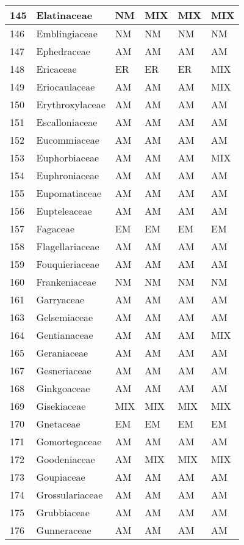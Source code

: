 \documentclass[]{article}
\begin{document}
\begin{longtable}{l|l|l|l|l|l}
\hline
145 & Elatinaceae & NM & MIX & MIX & MIX\\
\hline
146 & Emblingiaceae & NM & NM & NM & NM\\
\hline
147 & Ephedraceae & AM & AM & AM & AM\\
\hline
148 & Ericaceae & ER & ER & ER & MIX\\
\hline
149 & Eriocaulaceae & AM & AM & AM & MIX\\
\hline
150 & Erythroxylaceae & AM & AM & AM & AM\\
\hline
151 & Escalloniaceae & AM & AM & AM & AM\\
\hline
152 & Eucommiaceae & AM & AM & AM & AM\\
\hline
153 & Euphorbiaceae & AM & AM & AM & MIX\\
\hline
154 & Euphroniaceae & AM & AM & AM & AM\\
\hline
155 & Eupomatiaceae & AM & AM & AM & AM\\
\hline
156 & Eupteleaceae & AM & AM & AM & AM\\
\hline
157 & Fagaceae & EM & EM & EM & EM\\
\hline
158 & Flagellariaceae & AM & AM & AM & AM\\
\hline
159 & Fouquieriaceae & AM & AM & AM & AM\\
\hline
160 & Frankeniaceae & NM & NM & NM & NM\\
\hline
161 & Garryaceae & AM & AM & AM & AM\\
\hline
163 & Gelsemiaceae & AM & AM & AM & AM\\
\hline
164 & Gentianaceae & AM & AM & AM & MIX\\
\hline
165 & Geraniaceae & AM & AM & AM & AM\\
\hline
167 & Gesneriaceae & AM & AM & AM & AM\\
\hline
168 & Ginkgoaceae & AM & AM & AM & AM\\
\hline
169 & Gisekiaceae & MIX & MIX & MIX & MIX\\
\hline
170 & Gnetaceae & EM & EM & EM & EM\\
\hline
171 & Gomortegaceae & AM & AM & AM & AM\\
\hline
172 & Goodeniaceae & AM & MIX & MIX & MIX\\
\hline
173 & Goupiaceae & AM & AM & AM & AM\\
\hline
174 & Grossulariaceae & AM & AM & AM & AM\\
\hline
175 & Grubbiaceae & AM & AM & AM & AM\\
\hline
176 & Gunneraceae & AM & AM & AM & AM\\

\end{longtable}
\end{document}
